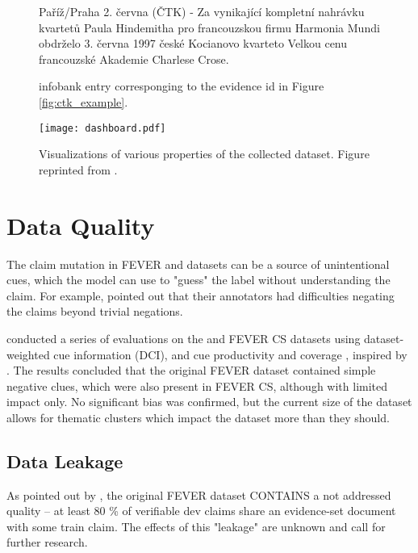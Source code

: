 \begin{figure}[h!]
    \begin{framed}
        Paříž/Praha 2. června (ČTK) - Za vynikající kompletní nahrávku kvartetů Paula Hindemitha pro francouzskou firmu Harmonia Mundi obdrželo 3. června 1997 české Kocianovo kvarteto Velkou cenu francouzské Akademie Charlese Crose.
    \end{framed}
    \caption[\CTK{} Infobank Example]{\CTK{} infobank entry corresponging to the evidence id in Figure \ref{fig:ctk_example}.}
\end{figure}

\begin{figure}[h!]
  \texttt{[image: dashboard.pdf]}
  \caption[Visualizations of Properties of the Collected Dataset]{Visualizations of various properties of the collected \CTK{} dataset. Figure reprinted from \citet{ullrich}.}
  \label{fig:dashboard}
\end{figure}

\section{Data Quality}

The claim mutation in FEVER and \CTK{} datasets can be a source of unintentional cues, which the model can use to "guess" the label without understanding the claim.
For example, \citet{fever} pointed out that their annotators had difficulties negating the claims beyond trivial negations.

\citet{rypar} conducted a series of evaluations on the \CTK{} and FEVER CS datasets using dataset-weighted cue information (DCI), and cue productivity and coverage \citep{niven-probing}, inspired by \citet{derczynski-etal-2020-maintaining}.
The results concluded that the original FEVER dataset contained simple negative clues, which were also present in FEVER CS, although with limited impact only. No significant bias was confirmed, but the current size of the \CTK{} dataset allows for thematic clusters which impact the dataset more than they should. 

\subsection{Data Leakage}
\label{subsec:data_leakage}

As pointed out by \citet{ullrich}, the original FEVER dataset CONTAINS a not addressed quality -- at least 80 \% of verifiable dev claims share an evidence-set document with some train claim. The effects of this "leakage" are unknown and call for further research.